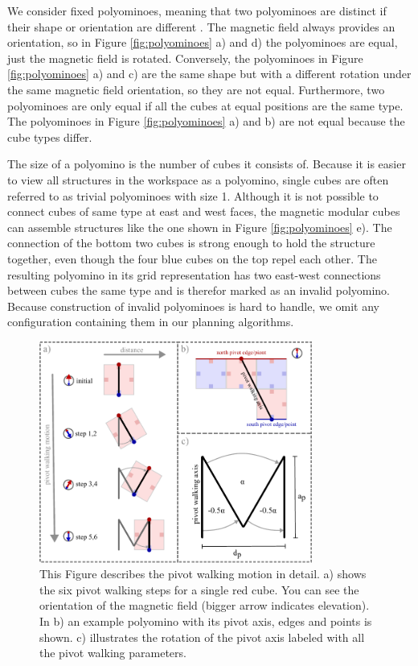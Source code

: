 We consider fixed polyominoes, meaning that two polyominoes are distinct if their shape or orientation are different \cite{Lu2021}.
The magnetic field always provides an orientation, so in Figure \ref{fig:polyominoes} a) and d) the polyominoes are equal, just the magnetic field is rotated.
Conversely, the polyominoes in Figure \ref{fig:polyominoes} a) and c) are the same shape but with a different rotation under the same magnetic field orientation, so they are not equal.
Furthermore, two polyominoes are only equal if all the cubes at equal positions are the same type.
The polyominoes in Figure \ref{fig:polyominoes} a) and b) are not equal because the cube types differ.

The size of a polyomino is the number of cubes it consists of.
Because it is easier to view all structures in the workspace as a polyomino, single cubes are often referred to as trivial polyominoes with size 1.
Although it is not possible to connect cubes of same type at east and west faces, the magnetic modular cubes can assemble structures like the one shown in Figure \ref{fig:polyominoes} e).
The connection of the bottom two cubes is strong enough to hold the structure together, even though the four blue cubes on the top repel each other.
The resulting polyomino in its grid representation has two east-west connections between cubes the same type and is therefor marked as an invalid polyomino.
Because construction of invalid polyominoes is hard to handle, we omit any configuration containing them in our planning algorithms.


\begin{figure}
	\centering
	\includegraphics[width=0.80\textwidth]{figures/pivot_walking.pdf}
	\caption{This Figure describes the pivot walking motion in detail. a) shows the six pivot walking steps for a single red cube. You can see the orientation of the magnetic field (bigger arrow indicates elevation). In b) an example polyomino with its pivot axis, edges and points is shown. c) illustrates the rotation of the pivot axis labeled with all the pivot walking parameters.}
	\label{fig:pivot_walking}
\end{figure}

